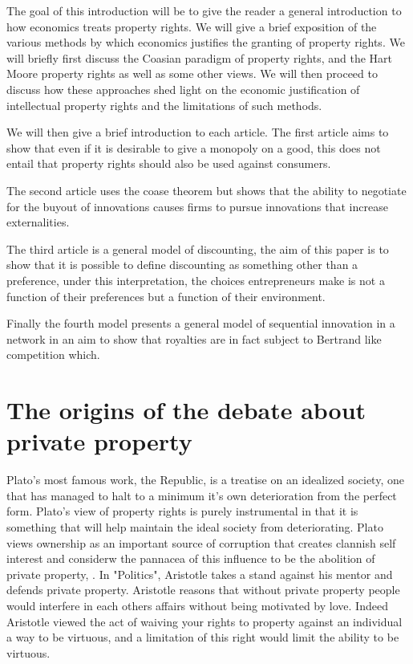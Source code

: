 \documentclass[12pt]{article}
\numberwithin{equation}{section}
\begin{document}
The goal of this introduction will be to give the reader a general introduction to how economics treats property rights. We will give a brief exposition of the various methods by which economics justifies the granting of property rights. We will briefly first discuss the Coasian paradigm of property rights, and the Hart Moore property rights as well as some other views. We will then proceed to discuss how these approaches shed light on the economic justification of intellectual property rights and the limitations of such methods. 

We will then give a brief introduction to each article. 
The first article aims to show that even if it is desirable to give a monopoly on a good, this does not entail that property rights should also be used against consumers. 

The second article uses the coase theorem but shows that the ability to negotiate for the buyout of innovations causes firms to pursue innovations that increase externalities. 

The third article is a general model of discounting, the aim of this paper is to show that it is possible to define discounting as something other than a preference, under this interpretation, the choices entrepreneurs make is not a function of their preferences but a function of their environment. 

Finally the fourth model presents a general model of sequential innovation in a network in an aim to show that royalties are in fact subject to Bertrand like competition which.

\section{The origins of the debate about private property}

Plato's most famous work, the Republic, is a treatise on an idealized society, one that has managed to halt to a minimum it's own deterioration from the perfect form. Plato's view of property rights is purely instrumental in that it is something that will help maintain the ideal society from deteriorating. Plato views ownership as an important source of corruption that creates clannish self interest and considerw the pannacea of this influence to be the abolition of private property,
. 
In "Politics", Aristotle takes a stand against his mentor and defends private property. Aristotle reasons that without private property people would interfere in each others affairs without being motivated by love. Indeed Aristotle viewed the act of waiving your rights to property against an individual a way to be virtuous, and a limitation of this right would limit the ability to be virtuous.
\end{document}

